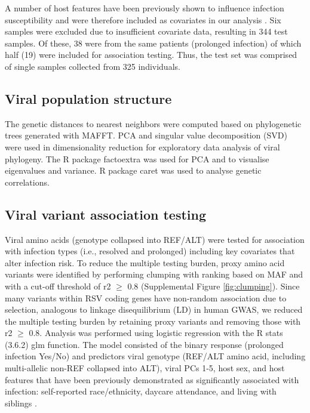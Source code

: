 \documentclass[9pt,lineno]{elife}  %
\begin{document}
A number of host features have been previously shown to influence infection susceptibility and were therefore included as covariates in our analysis \citep{rosas2022upper}. 
Six samples were excluded due to insufficient covariate data, resulting in 344 test samples. 
Of these, 38 were from the same patients (prolonged infection) of which half (19) were included for association testing. Thus, the test set was comprised of single samples collected from 325 individuals.

\subsection{Viral population structure}
The genetic distances to nearest neighbors were computed based on phylogenetic trees generated with MAFFT. 
PCA and singular value decomposition (SVD) were used in dimensionality reduction for exploratory data analysis of viral phylogeny. 
The R package factoextra was used for PCA and to visualise eigenvalues and variance. R package caret was used to analyse genetic correlations.

\subsection{Viral variant association testing}
Viral amino acids (genotype collapsed into REF/ALT) were tested for association with infection types (i.e., resolved and prolonged) including key covariates that alter infection risk. 
To reduce the multiple testing burden, proxy amino acid variants were identified by performing clumping with ranking based on MAF and with a cut-off threshold of r2 $\ge$ 0.8 (Supplemental Figure \ref{fig:clumping}). 
Since many variants within RSV coding genes have non-random association due to selection, analogous to linkage disequilibrium (LD) in human GWAS, we reduced the multiple testing burden by retaining proxy variants and removing those with r2 $\ge$ 0.8. 
Analysis was performed using logistic regression with the R stats (3.6.2) glm function. 
The model consisted of the binary response (prolonged infection Yes/No) and predictors viral genotype (REF/ALT amino acid, including multi-allelic non-REF collapsed into ALT), viral PCs 1-5, host sex, and host features that have been previously demonstrated as significantly associated with infection: self-reported race/ethnicity, daycare attendance, and living with siblings 
\citep{rosas2022upper}.
\end{document}
